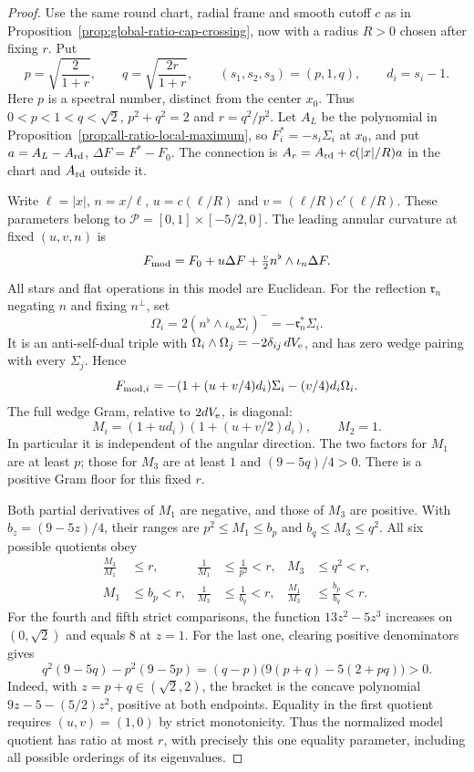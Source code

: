 \documentclass[11pt]{article}
\numberwithin{equation}{section}
\theoremstyle{definition}
\theoremstyle{remark}
\begin{document}
\begin{proof}
Use the same round chart, radial frame and smooth cutoff $c$
as in Proposition~\ref{prop:global-ratio-cap-crossing}, now
with a radius $R>0$ chosen after fixing $r$. Put
\[
 p=\sqrt{\frac2{1+r}},\qquad
 q=\sqrt{\frac{2r}{1+r}},\qquad
 (s_1,s_2,s_3)=(p,1,q),\qquad d_i=s_i-1.
\]
Here $p$ is a spectral number, distinct from the center $x_0$.
Thus $0<p<1<q<\sqrt2$, $p^2+q^2=2$ and $r=q^2/p^2$.
Let $A_L$ be the polynomial in
Proposition~\ref{prop:all-ratio-local-maximum}, so
$F_i^*=-s_i\Sigma_i$ at $x_0$, and put
$a=A_L-A_{\rm rd}$, $\Delta F=F^*-F_0$.
The connection is $A_r=A_{\rm rd}+c(|x|/R)a$ in the chart
and $A_{\rm rd}$ outside it.

Write $\ell=|x|$, $n=x/\ell$, $u=c(\ell/R)$ and
$v=(\ell/R)c'(\ell/R)$. These parameters belong to
$\mathcal P=[0,1]\times[-5/2,0]$. The leading annular
curvature at fixed $(u,v,n)$ is
\[
 F_{\rm mod}=F_0+u\Delta F
                  +\tfrac v2 n^\flat\wedge\iota_n\Delta F.
\]
All stars and flat operations in this model are Euclidean.
For the reflection $\mathfrak r_n$ negating $n$ and fixing
$n^\perp$, set
\[
 \Omega_i=2(n^\flat\wedge\iota_n\Sigma_i)^-
          =-\mathfrak r_n^*\Sigma_i.
\]
It is an anti-self-dual triple with
$\Omega_i\wedge\Omega_j=-2\delta_{ij}\,dV_{\rm e}$,
and has zero wedge pairing with every $\Sigma_j$. Hence
\[
 F_{{\rm mod},i}
   =-(1+(u+v/4)d_i)\Sigma_i-(v/4)d_i\Omega_i.
\]
The full wedge Gram, relative to $2dV_{\rm e}$, is diagonal:
\begin{equation}\label{eq:fixed-ratio-model-gram}
 M_i=(1+ud_i)(1+(u+v/2)d_i),\qquad M_2=1.
\end{equation}
In particular it is independent of the angular direction.
The two factors for $M_1$ are at least $p$; those for
$M_3$ are at least $1$ and $(9-5q)/4>0$. There is a
positive Gram floor for this fixed $r$.

Both partial derivatives of $M_1$ are negative, and those
of $M_3$ are positive. With $b_z=(9-5z)/4$, their ranges
are $p^2\le M_1\le b_p$ and $b_q\le M_3\le q^2$.
All six possible quotients obey
\[
 \begin{aligned}
 \frac{M_3}{M_1}&\le r,&
 \frac1{M_1}&\le\frac1{p^2}<r,&
 M_3&\le q^2<r,\\
 M_1&\le b_p<r,&
 \frac1{M_3}&\le\frac1{b_q}<r,&
 \frac{M_1}{M_3}&\le\frac{b_p}{b_q}<r.
 \end{aligned}
\]
For the fourth and fifth strict comparisons, the function
$13z^2-5z^3$ increases on $(0,\sqrt2)$ and equals $8$ at
$z=1$. For the last one, clearing positive denominators gives
\[
 q^2(9-5q)-p^2(9-5p)
 =(q-p)\bigl(9(p+q)-5(2+pq)\bigr)>0.
\]
Indeed, with $z=p+q\in(\sqrt2,2)$, the bracket is the
concave polynomial $9z-5-(5/2)z^2$, positive at both
endpoints. Equality in the first quotient requires
$(u,v)=(1,0)$ by strict monotonicity. Thus the normalized
model quotient has ratio at most $r$, with precisely this
one equality parameter, including all possible orderings
of its eigenvalues.


\end{proof}
\end{document}
